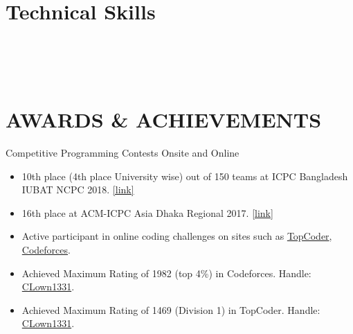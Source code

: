 \documentclass{resumestyle}
\begin{document}
\section{Technical Skills}%
\enspace%
\enspace%
\enspace%
\thinspace\thinspace%
\vspace{4pt}\\%
\enspace%
\enspace%
\enspace%
\enspace%
\vspace{4pt}\\%
\thinspace\thinspace%
\thinspace\thinspace%
\enspace%
\enspace%
\vspace{4pt}\\%
\thinspace\thinspace%
\thinspace\thinspace%
\thinspace\thinspace%
\thinspace\thinspace%

\section{AWARDS \& ACHIEVEMENTS}%

    \worksubsection%
        {Competitive Programming Contests}%
        {Onsite and Online}%
    
    \begin{itemize}[labelsep=4pt,leftmargin=*,topsep=5pt,partopsep=0pt,itemsep=1pt]%
        \item 10th place (4th place University wise) out of 150 teams at ICPC Bangladesh IUBAT NCPC 2018. {\href{https://araf.aljami.me/assets/pdf/2019-Bangladesh%20IUBAT%20NCPC-PLACE.pdf}{[link]}}
        \item 16th place at ACM-ICPC Asia Dhaka Regional 2017. {\href{https://araf.aljami.me/assets/pdf/2018-Asia%20Dhaka%202017-PLACE.pdf}{[link]}}
        \item Active participant in online coding challenges on sites such as {\href{https://www.topcoder.com/members/CLown1331/}{TopCoder}}, {\href{http://codeforces.com/profile/CLown1331}{Codeforces}}.
        \item Achieved Maximum Rating of 1982 (top 4\%) in Codeforces. Handle: {\href{http://codeforces.com/profile/CLown1331}{CLown1331}}. 
        \item Achieved Maximum Rating of 1469 (Division 1) in TopCoder. Handle: {\href{https://www.topcoder.com/members/CLown1331/}{CLown1331}}.
    \end{itemize}%
\end{document}
